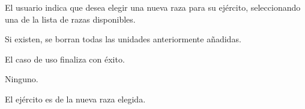 {
  \item El usuario indica que desea elegir una nueva raza para su ejército, seleccionando una de la lista de razas disponibles.
  \item Si existen, se borran todas las unidades anteriormente añadidas.
  \item El caso de uso finaliza con éxito.
}
{
  \item Ninguno.
}
{El ejército es de la nueva raza elegida.}
